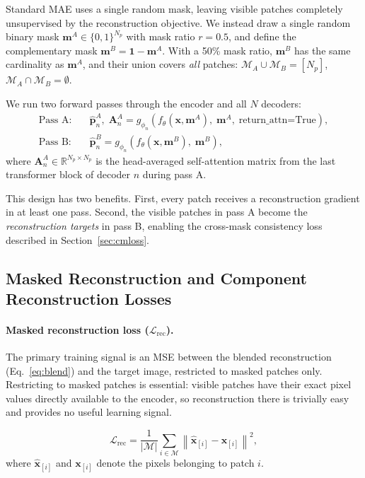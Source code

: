\documentclass{article}
\newcommand{\RR}{\mathbb{R}}
\newcommand{\bx}{\mathbf{x}}
\newcommand{\bp}{\mathbf{p}}
\newcommand{\bA}{\mathbf{A}}
\begin{document}
Standard MAE uses a single random mask, leaving visible patches completely
unsupervised by the reconstruction objective.  We instead draw a single random
binary mask $\mathbf{m}^A \in \{0,1\}^{N_p}$ with mask ratio $r\!=\!0.5$, and
define the complementary mask $\mathbf{m}^B = \mathbf{1} - \mathbf{m}^A$.
With a 50\% mask ratio, $\mathbf{m}^B$ has the same cardinality as $\mathbf{m}^A$,
and their union covers \emph{all} patches:
$\mathcal{M}_A \cup \mathcal{M}_B = [N_p]$,\ \  $\mathcal{M}_A \cap \mathcal{M}_B = \emptyset$.

We run two forward passes through the encoder and all $N$ decoders:
\begin{align}
  \text{Pass A:} \quad &\hat{\bp}_n^A,\; \bA_n^A = g_{\phi_n}\!\left(f_\theta(\bx, \mathbf{m}^A),\; \mathbf{m}^A,\; \text{return\_attn=True}\right), \\
  \text{Pass B:} \quad &\hat{\bp}_n^B = g_{\phi_n}\!\left(f_\theta(\bx, \mathbf{m}^B),\; \mathbf{m}^B\right),
\end{align}
where $\bA_n^A \in \RR^{N_p \times N_p}$ is the head-averaged self-attention matrix
from the last transformer block of decoder $n$ during pass A.

This design has two benefits.  First, every patch receives a reconstruction
gradient in at least one pass.  Second, the visible patches in pass A become the
\emph{reconstruction targets} in pass B, enabling the cross-mask consistency loss
described in Section~\ref{sec:cmloss}.

\subsection{Masked Reconstruction and Component Reconstruction Losses}
\label{sec:reconloss}

\paragraph{Masked reconstruction loss ($\mathcal{L}_\mathrm{rec}$).}
The primary training signal is an MSE between the blended reconstruction
(Eq.~\ref{eq:blend}) and the target image, restricted to masked patches only.
Restricting to masked patches is essential: visible patches have their exact
pixel values directly available to the encoder, so reconstruction there is
trivially easy and provides no useful learning signal.

\begin{equation}
  \mathcal{L}_\mathrm{rec} = \frac{1}{|\mathcal{M}|} \sum_{i \in \mathcal{M}}
  \left\|\hat{\bx}_{[i]} - \bx_{[i]}\right\|^2,
\end{equation}
where $\hat{\bx}_{[i]}$ and $\bx_{[i]}$ denote the pixels belonging to patch $i$.
\end{document}
